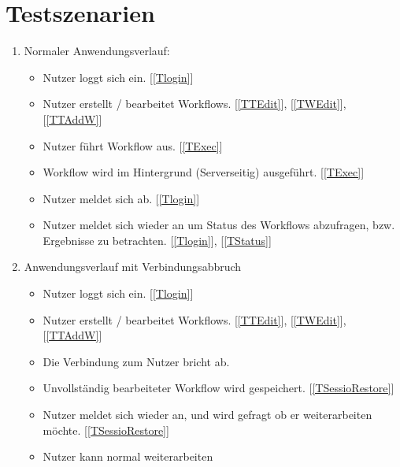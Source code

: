    \section{Testszenarien}
            \begin{enumerate}[font={\bfseries}, label={TS\arabic*}0, wide=0pt, labelindent=1em, leftmargin=*]

            \item Normaler Anwendungsverlauf:
        \begin{itemize}
            \item Nutzer loggt sich ein. [\ref{Tlogin}]
            \item Nutzer erstellt / bearbeitet Workflows. [\ref{TTEdit}], [\ref{TWEdit}], [\ref{TTAddW}]
            \item Nutzer führt Workflow aus. [\ref{TExec}]
            \item Workflow wird im Hintergrund (Serverseitig) ausgeführt. [\ref{TExec}]
            \item Nutzer meldet sich ab. [\ref{Tlogin}]
            \item Nutzer meldet sich wieder an um Status des Workflows abzufragen, bzw. Ergebnisse zu betrachten. [\ref{Tlogin}], [\ref{TStatus}]
        \end{itemize}
        \item Anwendungsverlauf mit Verbindungsabbruch
        \begin{itemize}
            \item Nutzer loggt sich ein. [\ref{Tlogin}]
            \item Nutzer erstellt / bearbeitet Workflows. [\ref{TTEdit}], [\ref{TWEdit}], [\ref{TTAddW}]
            \item Die Verbindung zum Nutzer bricht ab.
            \item Unvollständig bearbeiteter Workflow wird gespeichert. [\ref{TSessioRestore}]
            \item Nutzer meldet sich wieder an, und wird gefragt ob er weiterarbeiten möchte. [\ref{TSessioRestore}]
            \item Nutzer kann normal weiterarbeiten
        \end{itemize}
        \end{enumerate}
